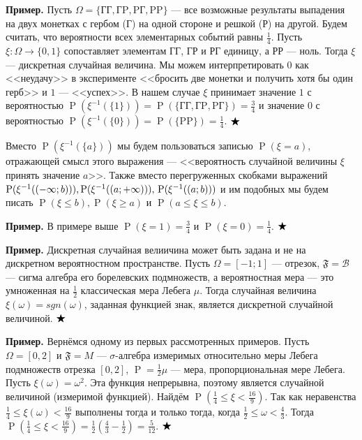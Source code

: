 \documentclass[12pt]{article}
\numberwithin{theorem}{section}
\theoremstyle{definition}
\newenvironment{example}{\indent \textbf{Пример.}}{$ \hfill \bigstar $}
\newcommand{\calB}{\mathcal{B}}
\newcommand{\prob}{\operatorname{P}}
\newcommand{\events}{\mathfrak{F}}
\begin{document}
	\begin{example}
		Пусть $ \Omega = \{\text{ГГ}, \text{ГP}, \text{PГ}, \text{PP}\} $
		--- все возможные результаты выпадения на двух монетках с гербом (Г) на одной стороне и решкой (Р) на другой.
		Будем считать, что вероятности всех элементарных событий равны $ \tfrac{1}{4} $.
		Пусть $ \xi \colon \Omega \to \{0, 1\} $ сопоставляет элементам ГГ, ГР и РГ единицу, а РР --- ноль.
		Тогда $ \xi $ --- дискретная случайная величина.
		Мы можем интерпретировать $ 0 $ как <<неудачу>> в эксперименте <<бросить две монетки и получить хотя бы один герб>> 
		и $ 1 $ --- <<успех>>. 
		В нашем случае $ \xi $ принимает значение $ 1 $ с вероятностью 
		$ \prob(\xi^{-1}(\{1\})) = \prob(\{\text{ГГ}, \text{ГP}, \text{PГ}\}) = \tfrac{3}{4} $ 
		и значение $ 0 $ с вероятностью $ \prob(\xi^{-1}(\{0\})) = \prob(\{\text{PP}\}) = \tfrac{1}{4} $.		
	\end{example}
	
	Вместо $ \prob(\xi^{-1}(\{a\})) $ мы будем пользоваться записью $ \prob(\xi = a) $, отражающей смысл этого выражения
	--- <<вероятность случайной величины $ \xi $ принять значение $ a $>>.
	Также вместо перегруженных скобками выражений 
	$ \prob(\xi^{-1}((-\infty; b))), \prob(\xi^{-1}((a; +\infty))), \\ \prob(\xi^{-1}((a; b))) $ 
	и им подобных мы будем писать $ \prob(\xi \leqslant b), \prob(\xi \geqslant a) $ и 
	$ \prob(a \leqslant \xi \leqslant b) $.
	
	\begin{example}
		В примере выше $ \prob(\xi = 1) = \tfrac{3}{4} $ и $ \prob(\xi = 0) = \tfrac{1}{4} $.
	\end{example}
	
	\begin{example}
		Дискретная случайная велиичина может быть задана и не на дискретном вероятностном пространстве.
		Пусть $ \Omega = [-1;1] $ --- отрезок, $ \events = \calB $ --- сигма алгебра его борелевских подмножеств,
		а вероятностная мера --- это умноженная на $ \tfrac{1}{2} $ классическая мера Лебега $ \mu $.
		Тогда случайная величина $ \xi(\omega) = sgn(\omega) $, заданная функцией знак, 
		является дискретной случайной величиной.
	\end{example}
	
	\begin{example}
		Вернёмся одному из первых рассмотренных примеров. Пусть $ \Omega = [0, 2] $ и $ \events = M $ --- $ \sigma $-алгебра измеримых относительно меры Лебега
		подмножеств отрезка $ [0, 2] $, $ \prob = \tfrac{1}{2}\mu $ --- мера, пропорциональная мере Лебега.
		Пусть $ \xi(\omega) = \omega^2 $. Эта функция непрерывна, поэтому является случайной величиной (измеримой функцией).
		Найдём $ \prob(\tfrac{1}{4} \leqslant \xi < \tfrac{16}{9}) $.
		Так как неравенства $ \tfrac{1}{4} \leqslant \xi(\omega) < \tfrac{16}{9} $ выполнены тогда и только тогда, когда
		$ \tfrac{1}{2} \leqslant \omega < \tfrac{4}{3} $. Тогда $ \prob(\tfrac{1}{4} \leqslant \xi < \tfrac{16}{9}) = \tfrac{1}{2}(\tfrac{4}{3} - \tfrac{1}{2}) = \tfrac{5}{12} $.
	\end{example}
	
\end{document}
